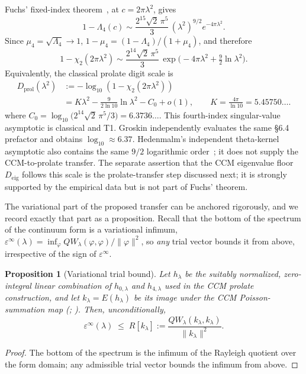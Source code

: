 \documentclass[11pt,a4paper]{article}
\newtheorem{proposition}{Proposition}
\begin{document}
Fuchs' fixed-index theorem~\cite{Fuchs1964}, at
$c=2\pi\lambda^2$, gives
\[
  1-\Lambda_4(c)\sim \frac{2^{15}\sqrt{2}\,\pi^5}{3}\,
  (\lambda^2)^{9/2}e^{-4\pi\lambda^2}.
\]
Since $\mu_4=\sqrt{\Lambda_4}\to1$,
$1-\mu_4=(1-\Lambda_4)/(1+\mu_4)$, and therefore
\begin{equation}\label{eq:prolatefloor}
  1-\chi_2(2\pi\lambda^2)\sim
  \frac{2^{14}\sqrt{2}\,\pi^5}{3}\,
  \exp\!\bigl(-4\pi\lambda^2+\tfrac92\ln\lambda^2\bigr).
\end{equation}
Equivalently, the classical prolate digit scale is
\begin{equation}\label{eq:eigfloor}
  \begin{aligned}
  D_{\mathrm{prol}}(\lambda^2)
    &:=-\log_{10}(1-\chi_2(2\pi\lambda^2))\\
    &=K\lambda^2-\frac{9}{2\ln10}\ln\lambda^2-C_0+o(1),
      \qquad K=\frac{4\pi}{\ln10}=5.45750\ldots.
  \end{aligned}
\end{equation}
where
$C_0=\log_{10}\!\bigl(2^{14}\sqrt{2}\,\pi^5/3\bigr)=6.3736\ldots$.
This fourth-index singular-value asymptotic is classical and T1. Groskin
\cite{Groskin2026} independently evaluates the same \S6.4 prefactor and obtains
$\log_{10}\approx6.37$. Hedenmalm's independent theta-kernel asymptotic also
contains the same $9/2$ logarithmic order~\cite{Hedenmalm2026}; it does not
supply the CCM-to-prolate transfer. The separate assertion that the CCM eigenvalue floor
$D_{\mathrm{eig}}$ follows this scale is the prolate-transfer step discussed
next; it is strongly supported by the empirical data but is not part of
Fuchs' theorem.

The variational part of the proposed transfer can be anchored rigorously, and
we record exactly that part as a proposition. Recall that the bottom of the spectrum of the continuum form is a
variational infimum, $\varepsilon^\infty(\lambda)=\inf_\varphi
QW_\lambda(\varphi,\varphi)/\|\varphi\|^2$, so \emph{any} trial vector bounds it
from above, irrespective of the sign of $\varepsilon^\infty$.

\begin{proposition}[Variational trial bound]\label{prop:variational}
Let $h_\lambda$ be the suitably normalized, zero-integral linear combination
of $h_{0,\lambda}$ and $h_{4,\lambda}$ used in the CCM prolate construction,
and let $k_\lambda=E(h_\lambda)$ be its image under the CCM Poisson-summation
map (\cite[\S7]{CCM2025}; \cite[\S6.4]{Connes2026}). Then, unconditionally,
\[
  \varepsilon^\infty(\lambda)\;\le\;
  R[k_\lambda]:=\frac{QW_\lambda(k_\lambda,k_\lambda)}{\|k_\lambda\|^2}.
\]
\end{proposition}
\begin{proof}
The bottom of the spectrum is the infimum of the Rayleigh quotient over the
form domain; any admissible trial vector bounds the infimum from above.
\end{proof}
\end{document}
